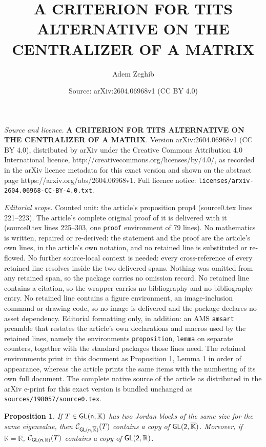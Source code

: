 \documentclass[10pt,a4paper]{amsart}
\title{{\small\textbf{A CRITERION FOR TITS ALTERNATIVE ON THE CENTRALIZER OF A MATRIX}}}
\author{Adem Zeghib}
\date{Source: arXiv:2604.06968v1 (CC BY 4.0)}
\newtheorem{proposition}{Proposition}
\newcommand{\C}{\mathcal C}
\def \GL{\sf{GL}}
\newcommand{\K}{\mathbb K}
\newcommand{\R}{\mathbb R}
\begin{document}
\maketitle

\noindent\emph{Source and licence.} {\small\textbf{A CRITERION FOR TITS ALTERNATIVE ON THE CENTRALIZER OF A MATRIX}}. Version arXiv:2604.06968v1 (CC BY 4.0), distributed by arXiv under the Creative Commons Attribution 4.0 International licence, http://creativecommons.org/licenses/by/4.0/, as recorded in the arXiv licence metadata for this exact version and shown on the abstract page https://arxiv.org/abs/2604.06968v1. Full licence notice: \texttt{licenses/arxiv-2604.06968-CC-BY-4.0.txt}.\par\smallskip

\noindent\textit{Editorial scope.} Counted unit: the article's proposition prop4 (source0.tex lines 221--223). The article's complete original proof of it is delivered with it (source0.tex lines 225--303, one \texttt{proof} environment of 79 lines). No mathematics is written, repaired or re-derived: the statement and the proof are the article's own lines, in the article's own notation, and no retained line is substituted or re-flowed.  No further source-local context is needed: every cross-reference of every retained line resolves inside the two delivered spans.  Nothing was omitted from any retained span, so the package carries no omission record.  No retained line contains a citation, so the wrapper carries no bibliography and no bibliography entry.  No retained line contains a figure environment, an image-inclusion command or drawing code, so no image is delivered and the package declares no asset dependency.  Editorial formatting only, in addition: an AMS \texttt{amsart} preamble that restates the article's own declarations and macros used by the retained lines, namely the environments \texttt{proposition}, \texttt{lemma} on separate counters, together with the standard packages those lines need.  The retained environments print in this document as Proposition 1, Lemma 1 in order of appearance, whereas the article prints the same items with the numbering of its own full document.  The complete native source of the article as distributed in the arXiv e-print for this exact version is bundled unchanged as \texttt{sources/198057/source0.tex}.
\begin{proposition}\label{prop4}
If $T \in \GL(n,\K)$ has two Jordan blocks of the same size for the same eigenvalue, then $\C_{\GL(n,\overline{\K})}(T)$ contains a copy of $\GL(2,\overline{\K})$. Moreover, if $\K=\R$, $\C_{\GL(n,\R)}(T)$ contains a copy of $\GL(2, \R)$.
\end{proposition}
\end{document}
